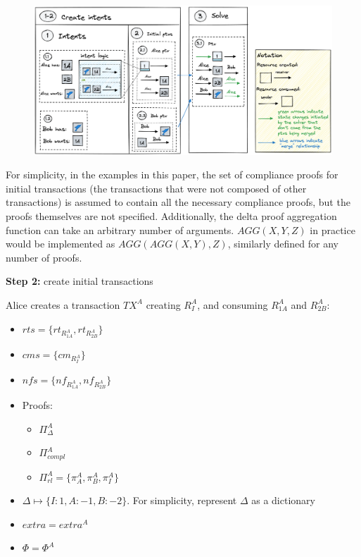 \documentclass[
    11pt,            %
    techreport,        %
    affiltop,       %
]{art}
\begin{document}
\begin{figure}[!h]
\begin{center}
    \includegraphics[width = \textwidth]{2party_rm_new.png}
\end{center}
\end{figure}

\begin{remark}
    For simplicity, in the examples in this paper, the set of compliance proofs for initial transactions (the transactions that were not composed of other transactions) is assumed to contain all the necessary compliance proofs, but the proofs themselves are not specified. Additionally, the delta proof aggregation function can take an arbitrary number of arguments. $AGG(X, Y, Z)$ in practice would be implemented as $AGG(AGG(X, Y), Z)$, similarly defined for any number of proofs.
\end{remark}

\textbf{Step 2:} create initial transactions

Alice creates a transaction $TX^A$ creating $R^A_I$, and consuming $R^A_{1A}$ and $R^A_{2B}$:
\begin{itemize}
    \item $rts= \{rt_{R^A_{1A}}, rt_{R^A_{2B}}\}$
    \item $cms = \{cm_{R^A_I}\}$
    \item $nfs = \{nf_{R^A_{1A}}, nf_{R^A_{2B}}\}$
    \item Proofs:
    \begin{itemize}
        \item $\Pi^A_{\Delta}$
        \item $\Pi^A_{compl}$
        \item $\Pi^A_{rl} = \{\pi^A_A, \pi^A_B, \pi^A_I\}$
    \end{itemize}
    \item $\Delta \mapsto \{I: 1, A: -1, B: -2\}$. For simplicity, represent $\Delta$ as a dictionary
    \item $extra = extra^A$
    \item $\Phi = \Phi^A$
\end{itemize}
\end{document}
